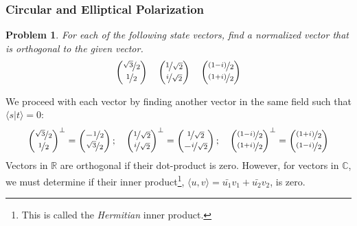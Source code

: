 \documentclass[12pt]{article}
\newenvironment{answer}
    {\begin{adjustwidth}{0pt}{0pt}}
    {\end{adjustwidth}}
\newtheorem{problem}{Problem}
\theoremstyle{remark}  %
\begin{document}
\setcounter{subsubsection}{2}
\subsubsection{Circular and Elliptical Polarization}
\setcounter{problem}{0}
    \begin{problem}
        For each of the following state vectors, find a normalized vector that is orthogonal to the given vector. $$\begin{pmatrix}
            \nicefrac{\sqrt{3}}{2} \\
            \nicefrac{1}{2}
        \end{pmatrix}\quad\begin{pmatrix}
            \nicefrac{1}{\sqrt{2}} \\
            \nicefrac{i}{\sqrt{2}}
        \end{pmatrix}\quad\begin{pmatrix}
            \nicefrac{(1-i)}{2} \\
            \nicefrac{(1+i)}{2}
        \end{pmatrix}$$
    \end{problem}
    \begin{answer}
        We proceed with each vector by finding another vector in the same field such that $\langle s|t \rangle=0$:
        $$\begin{pmatrix}
            \nicefrac{\sqrt{3}}{2} \\
            \nicefrac{1}{2}
        \end{pmatrix}^\perp = \begin{pmatrix}
            -\nicefrac{1}{2} \\
            \nicefrac{\sqrt{3}}{2}
        \end{pmatrix};\quad\begin{pmatrix}
            \nicefrac{1}{\sqrt{2}} \\
            \nicefrac{i}{\sqrt{2}}
        \end{pmatrix}^\perp = \begin{pmatrix}
            \nicefrac{1}{\sqrt{2}} \\
            -\nicefrac{i}{\sqrt{2}}
        \end{pmatrix};\quad\begin{pmatrix}
            \nicefrac{(1-i)}{2} \\
            \nicefrac{(1+i)}{2}
        \end{pmatrix}^\perp = \begin{pmatrix}
            \nicefrac{(1+i)}{2} \\
            \nicefrac{(1-i)}{2}
        \end{pmatrix}$$
        Vectors in $\mathbb{R}$ are orthogonal if their dot-product is zero. However, for vectors in $\mathbb{C}$, we must determine if their inner product\footnote{This is called the \emph{Hermitian} inner product.}, $\langle u,v \rangle = \bar{u_1}v_1 + \bar{u_2}v_2$, is zero.
    \end{answer}
\end{document}
